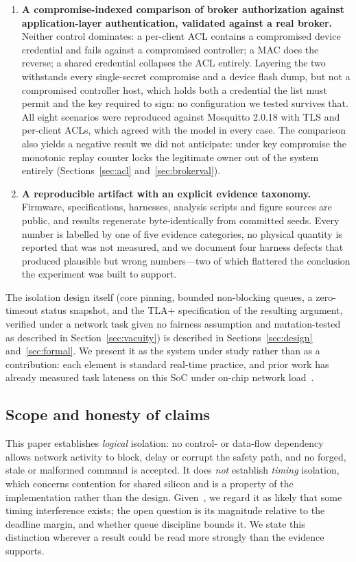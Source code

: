 \begin{enumerate}[leftmargin=1.4em,itemsep=0.25em]
\item \textbf{A compromise-indexed comparison of broker authorization against application-layer
authentication, validated against a real broker.} Neither control dominates: a per-client ACL
contains a compromised device credential and fails against a compromised controller; a MAC does
the reverse; a shared credential collapses the ACL entirely. Layering the two withstands every
single-secret compromise and a device flash dump, but not a compromised controller host, which
holds both a credential the list must permit and the key required to sign: no configuration we
tested survives that. All eight scenarios were reproduced against Mosquitto 2.0.18 with TLS and
per-client ACLs, which agreed with the model in every case. The comparison also
yields a negative result we did not anticipate: under key compromise the monotonic replay
counter locks the legitimate owner out of the system entirely
(Sections~\ref{sec:acl} and~\ref{sec:brokerval}).

\item \textbf{A reproducible artifact with an explicit evidence taxonomy.} Firmware,
specifications, harnesses, analysis scripts and figure sources are public, and results
regenerate byte-identically from committed seeds. Every number is labelled by one of five evidence categories,
no physical quantity is reported that was not measured, and we document four harness defects
that produced plausible but wrong numbers---two of which flattered the conclusion the experiment
was built to support.
\end{enumerate}

The isolation design itself (core pinning, bounded non-blocking queues, a zero-timeout status
snapshot, and the TLA+ specification of the resulting argument, verified under a network task
given no fairness assumption and mutation-tested as described in Section~\ref{sec:vacuity}) is described in Sections~\ref{sec:design}
and~\ref{sec:formal}. We present it as the system under study rather than as a contribution:
each element is standard real-time practice, and prior work has already measured task lateness
on this SoC under on-chip network load~\cite{behnke2020}.

\subsection{Scope and honesty of claims}

This paper establishes \emph{logical} isolation: no control- or data-flow dependency allows
network activity to block, delay or corrupt the safety path, and no forged, stale or malformed
command is accepted. It does \emph{not} establish \emph{timing} isolation, which concerns
contention for shared silicon and is a property of the implementation rather than the design.
Given~\cite{behnke2020}, we regard it as likely that some timing interference exists; the open
question is its magnitude relative to the deadline margin, and whether queue discipline bounds
it. We state this distinction wherever a result could be read more strongly than the evidence
supports.

